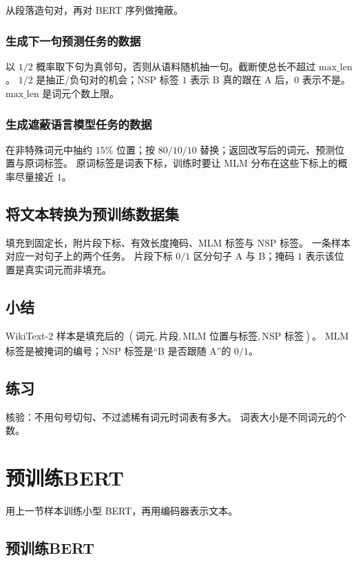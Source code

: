 从段落造句对，再对 BERT 序列做掩蔽。

\subsubsection{生成下一句预测任务的数据}

以 $1/2$ 概率取下句为真邻句，否则从语料随机抽一句。截断使总长不超过 $\mathrm{max\_len}$。
$1/2$ 是抽正/负句对的机会；NSP 标签 $1$ 表示 B 真的跟在 A 后，$0$ 表示不是。
$\mathrm{max\_len}$ 是词元个数上限。

\subsubsection{生成遮蔽语言模型任务的数据}

在非特殊词元中抽约 $15\%$ 位置；按 $80/10/10$ 替换；返回改写后的词元、预测位置与原词标签。
原词标签是词表下标，训练时要让 MLM 分布在这些下标上的概率尽量接近 $1$。

\subsection{将文本转换为预训练数据集}

填充到固定长，附片段下标、有效长度掩码、MLM 标签与 NSP 标签。
一条样本对应一对句子上的两个任务。
片段下标 $0/1$ 区分句子 A 与 B；掩码 $1$ 表示该位置是真实词元而非填充。

\subsection{小结}

WikiText-2 样本是填充后的
$(\text{词元},\text{片段},\text{MLM 位置与标签},\text{NSP 标签})$。
MLM 标签是被掩词的编号；NSP 标签是“B 是否跟随 A”的 $0/1$。

\subsection{练习}

核验：不用句号切句、不过滤稀有词元时词表有多大。
词表大小是不同词元的个数。

\section{预训练BERT}

用上一节样本训练小型 BERT，再用编码器表示文本。

\subsection{预训练BERT}

